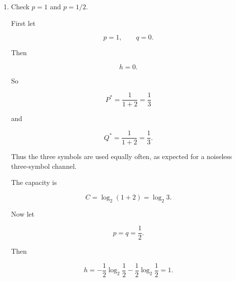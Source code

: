 \documentclass[11pt]{article}
\begin{document}
\begin{enumerate}
Start with

\[
I
=
-P\log_2P
-2Q\log_2Q
-2Qh.
\]

At the optimum,

\[
\frac{P}{Q}=2^h,
\]

so

\[
\log_2P
=
\log_2Q+h.
\]

Substitute this into \(I\):

\begin{align*}
I
&=
-P(\log_2Q+h)
-2Q\log_2Q
-2Qh \\
&=
-(P+2Q)\log_2Q
-(P+2Q)h.
\end{align*}

Since

\[
P+2Q=1,
\]

this becomes

\[
I
=
-\log_2Q-h.
\]

Using

\[
Q
=
\frac{2^{-h}}{1+2^{1-h}},
\]

we get

\begin{align*}
-\log_2Q
&=
-\log_2
\left(
\frac{2^{-h}}{1+2^{1-h}}
\right) \\
&=
h+\log_2(1+2^{1-h}).
\end{align*}

Therefore

\[
C
=
\log_2(1+2^{1-h}),
\]

where

\[
h=-p\log_2p-q\log_2q.
\]

\item Check \(p=1\) and \(p=1/2\).

First let

\[
p=1,
\qquad
q=0.
\]

Then

\[
h=0.
\]

So

\[
P^*
=
\frac{1}{1+2}
=
\frac13
\]

and

\[
Q^*
=
\frac{1}{1+2}
=
\frac13.
\]

Thus the three symbols are used equally often, as expected for a noiseless
three-symbol channel.

The capacity is

\[
C
=
\log_2(1+2)
=
\log_2 3.
\]

Now let

\[
p=q=\frac12.
\]

Then

\[
h
=
-\frac12\log_2\frac12
-\frac12\log_2\frac12
=
1.
\]


\end{enumerate}
\end{document}
